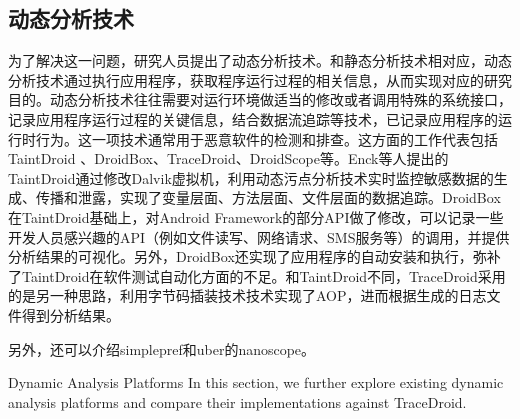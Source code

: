\subsection{动态分析技术}

为了解决这一问题，研究人员提出了动态分析技术。和静态分析技术相对应，动态分析技术通过执行应用程序，获取程序运行过程的相关信息，从而实现对应的研究目的。动态分析技术往往需要对运行环境做适当的修改或者调用特殊的系统接口，记录应用程序运行过程的关键信息，结合数据流追踪等技术，已记录应用程序的运行时行为。这一项技术通常用于恶意软件的检测和排查。这方面的工作代表包括TaintDroid 、DroidBox、TraceDroid、DroidScope等。Enck等人提出的TaintDroid通过修改Dalvik虚拟机，利用动态污点分析技术实时监控敏感数据的生成、传播和泄露，实现了变量层面、方法层面、文件层面的数据追踪。DroidBox在TaintDroid基础上，对Android Framework的部分API做了修改，可以记录一些开发人员感兴趣的API（例如文件读写、网络请求、SMS服务等）的调用，并提供分析结果的可视化。另外，DroidBox还实现了应用程序的自动安装和执行，弥补了TaintDroid在软件测试自动化方面的不足。和TaintDroid不同，TraceDroid采用的是另一种思路，利用字节码插装技术技术实现了AOP，进而根据生成的日志文件得到分析结果。

另外，还可以介绍simplepref和uber的nanoscope。

Dynamic Analysis Platforms In this section, we further explore existing dynamic analysis platforms and compare their implementations against TraceDroid. 


